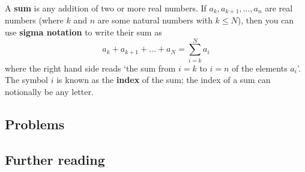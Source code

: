 \documentclass[
  12pt,
  a4paper, oneside]{starmastarticle}
\begin{document}
\begin{tcolorbox}[enhanced jigsaw, left=2mm, breakable, arc=.35mm, bottomrule=.15mm, opacityback=0, colframe=quarto-callout-note-color-frame, rightrule=.15mm, leftrule=.75mm, toprule=.15mm, colback=white]
\begin{minipage}[t]{5.5mm}
\textcolor{quarto-callout-note-color}{\faInfo}
\end{minipage}%
\begin{minipage}[t]{\textwidth - 5.5mm}
A \textbf{sum} is any addition of two or more real numbers. If
\(a_k,a_{k+1}, \ldots, a_n\) are real numbers (where \(k\) and \(n\) are
some natural numbers with \(k\leq N\)), then you can use \textbf{sigma
notation} to write their sum as
\[a_k + a_{k+1} + \ldots + a_N = \sum_{i = k}^N a_i\] where the right
hand side reads `the sum from \(i = k\) to \(i = n\) of the elements
\(a_i\)'. The symbol \(i\) is known as the \textbf{index} of the sum;
the index of a sum can notionally be any letter.\end{minipage}%
\end{tcolorbox}

\hypertarget{problems}{%
\subsection{Problems}\label{problems}}

\hypertarget{further-reading}{%
\subsection{Further reading}\label{further-reading}}
\end{document}
